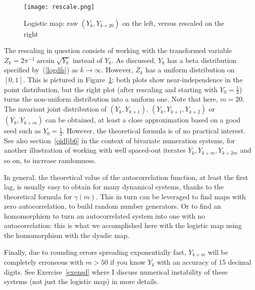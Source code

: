 \documentclass[oneside,10pt]{book}
\begin{document}
\begin{figure}[H]
\centering
\texttt{[image: rescale.png]}
\caption{Logistic map: raw $(Y_k,Y_{k+20})$ on the left, versus rescaled on the right}
\label{fig:picfrsc}
\end{figure}

The rescaling in question consists of working with the transformed variable $Z_k= 2\pi^{-1}\arcsin\sqrt{Y_k}$ instead of $Y_k$. As discussed, $Y_k$ has a beta distribution specified by~(\ref{logdfs}) as $k\rightarrow\infty$. However, $Z_k$ has a uniform distribution on $[0, 1]$. This is pictured in Figure~\ref{fig:picfrsc}: both plots show near-independence in the point distribution, but the right plot (after rescaling and starting with $Y_0=\frac{1}{3}$) turns the non-uniform distribution into a uniform one. Note that here, $m=20$.
The
  \textcolor{index}{invariant joint distribution} of $(Y_k,Y_{k+1})$,
$(Y_k, Y_{k+1},Y_{k+2})$ or $(Y_k,Y_{k+m})$ can be obtained, at least
 a close approximation based on a good seed such as $Y_0 =\frac{1}{3}$. However, the theoretical formula is of no practical interest.
See also section~\ref{oidfjb6} in the context of bivariate numeration systems, for another illustration of working with well spaced-out iterates $Y_{k},Y_{k+m},Y_{k+2m}$ and so on, to increase randomness.

 In general, the theoretical value of the
autocorrelation function, at least the first lag,
 is usually easy to obtain for many dynamical systems, thanks to the theoretical formula for $\gamma(m)$. This in turn can be
leveraged to find maps with zero autocorrelation, to
 build random number generators. Or to find an homomorphism to turn an autocorrelated system into one with no autocorrelation: this is what we accomplished here with the logistic map using the homomorphism with the dyadic map.


Finally, due to rounding errors spreading exponentially fast, $Y_{k+m}$ will be completely erroneous with $m>50$ if you know $Y_k$ with an accuracy of 15 decimal digits. See Exercise~\ref{exensd} where I discuss \textcolor{index}{numerical instability}  of these systems (not just the logistic map) in more details.
\end{document}
